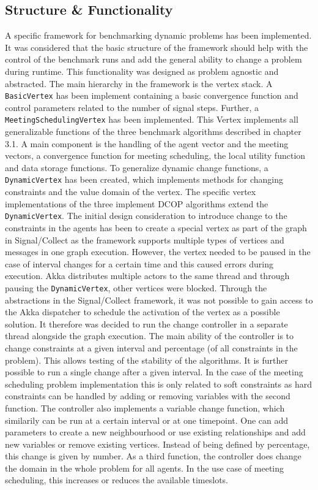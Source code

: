 \subsection{Structure \& Functionality}
A specific framework for benchmarking dynamic problems has been implemented. It was considered that the basic structure of the framework should help with the control of the benchmark runs and add the general ability to change a problem during runtime. This functionality was designed as problem agnostic and abstracted. The main hierarchy in the framework is the vertex stack. A \texttt{BasicVertex} has been implement containing a basic convergence function and control parameters related to the number of signal steps. Further, a \texttt{MeetingSchedulingVertex} has been implemented. This Vertex implements all generalizable functions of the three benchmark algorithms described in chapter 3.1. A main component is the handling of the agent vector and the meeting vectors, a convergence function for meeting scheduling, the local utility function and data storage functions. 
To generalize dynamic change functions, a \texttt{DynamicVertex} has been created, which implements methods for changing constraints and the value domain of the vertex. The specific vertex implementations of the three implement DCOP algorithms extend the \texttt{DynamicVertex}.
\newline \newline
The initial design consideration to introduce change to the constraints in the agents has been to create a special vertex as part of the graph in Signal/Collect as the framework supports multiple types of vertices and messages in one graph execution. However, the vertex needed to be paused in the case of interval changes for a certain time and this caused errors during execution. Akka distributes multiple actors to the same thread and through pausing the \texttt{DynamicVertex}, other vertices were blocked. Through the abstractions in the Signal/Collect framework, it was not possible to gain access to the Akka dispatcher to schedule the activation of the vertex as a possible solution. It therefore was decided to run the change controller in a separate thread alongside the graph execution. The main ability of the controller is to change constraints at a given interval and percentage (of all constraints in the problem). This allows testing of the stability of the algorithms. It is further possible to run a single change after a given interval. In the case of the meeting scheduling problem implementation this is only related to soft constraints as hard constraints can be handled by adding or removing variables with the second function. The controller also implements a variable change function, which similarily can be run at a certain interval or at one timepoint.  One can add parameters to create a new neighbourhood or use existing relationships and add new variables or remove existing vertices. Instead of being defined by percentage, this change is given by number. As a third function, the controller does change the domain in the whole problem for all agents. In the use case of meeting scheduling, this increases or reduces the available timeslots.
